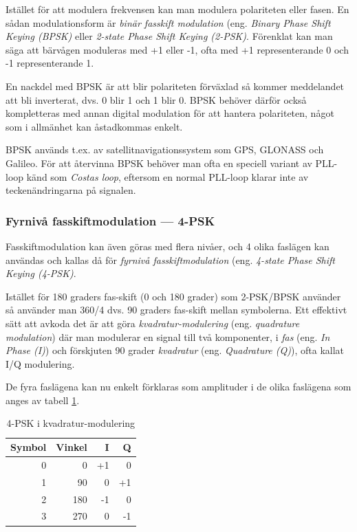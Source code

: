 Istället för att modulera frekvensen kan man modulera polariteten eller fasen.
En sådan modulationsform är \emph{binär fasskift modulation} (eng.
\emph{Binary Phase Shift Keying (BPSK)} eller \emph{2-state Phase Shift Keying
(2-PSK)}. Förenklat kan man säga att bärvågen moduleras med +1 eller -1,
ofta med +1 representerande 0 och -1 representerande 1.

En nackdel med BPSK är att blir polariteten förväxlad så kommer meddelandet
att bli inverterat, dvs. 0 blir 1 och 1 blir 0. BPSK behöver därför också
kompletteras med annan digital modulation för att hantera polariteten, något
som i allmänhet kan åstadkommas enkelt.

BPSK används t.ex. av satellitnavigationssystem som GPS, GLONASS och Galileo.
För att återvinna BPSK behöver man ofta en speciell variant av PLL-loop känd
som \emph{Costas loop}, eftersom en normal PLL-loop klarar inte av
teckenändringarna på signalen.

\subsubsection{Fyrnivå fasskiftmodulation --- 4-PSK}

Fasskiftmodulation kan även göras med flera nivåer, och 4 olika faslägen
kan användas och kallas då för \emph{fyrnivå fasskiftmodulation} (eng.
\emph{4-state Phase Shift Keying (4-PSK)}.

Istället för 180 graders fas-skift (0 och 180 grader) som 2-PSK/BPSK använder
så använder man 360/4 dvs. 90 graders fas-skift mellan symbolerna.
Ett effektivt sätt att avkoda det är att göra \emph{kvadratur-modulering}
(eng. \emph{quadrature modulation}) där man modulerar en signal till två
komponenter, i \emph{fas} (eng. \emph{In Phase (I)}) och förskjuten 90 grader \emph{kvadratur} (eng.
\emph{Quadrature (Q)}), ofta kallat I/Q modulering.

De fyra faslägena kan nu enkelt förklaras som amplituder i de olika faslägena
som anges av tabell \ref{tab:4-PSK}.

\begin{table}[ht]
\begin{center}
\begin{tabular}{|r|r|r|r|}
\hline
Symbol & Vinkel & I & Q \\ \hline
0 &   0 & +1 &  0 \\
1 &  90 &  0 & +1 \\
2 & 180 & -1 &  0 \\
3 & 270 &  0 & -1 \\ \hline
\end{tabular}
\end{center}
\caption{4-PSK i kvadratur-modulering}
\label{tab:4-PSK}
\end{table}

